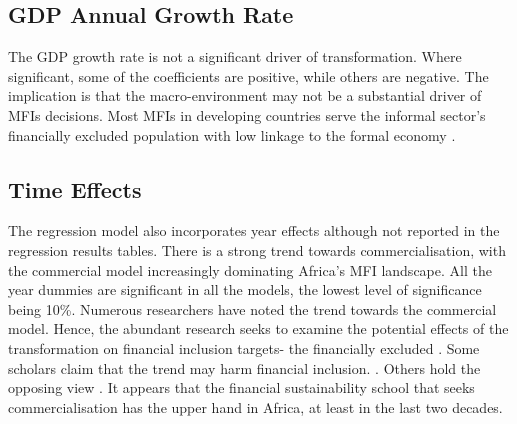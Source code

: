 \documentclass[a4paper,nobind]{templates/ociamthesis}
\begin{document}
\hypertarget{gdp-annual-growth-rate}{%
\subsection{GDP Annual Growth Rate}\label{gdp-annual-growth-rate}}

The GDP growth rate is not a significant driver of transformation. Where significant, some of the coefficients are positive, while others are negative. The implication is that the macro-environment may not be a substantial driver of MFIs decisions. Most MFIs in developing countries serve the informal sector's financially excluded population with low linkage to the formal economy \autocite{ghosh2013microfinance}.

\hypertarget{time-effects}{%
\subsection{Time Effects}\label{time-effects}}

The regression model also incorporates year effects although not reported in the regression results tables. There is a strong trend towards commercialisation, with the commercial model increasingly dominating Africa's MFI landscape. All the year dummies are significant in all the models, the lowest level of significance being 10\%. Numerous researchers have noted the trend towards the commercial model. Hence, the abundant research seeks to examine the potential effects of the transformation on financial inclusion targets- the financially excluded \autocite{d2017ngos}. Some scholars claim that the trend may harm financial inclusion. \autocite{meagher2006microfinance,hartarska2007regulated}. Others hold the opposing view \autocite{duvendack2015mis}. It appears that the financial sustainability school that seeks commercialisation has the upper hand in Africa, at least in the last two decades.
\end{document}
